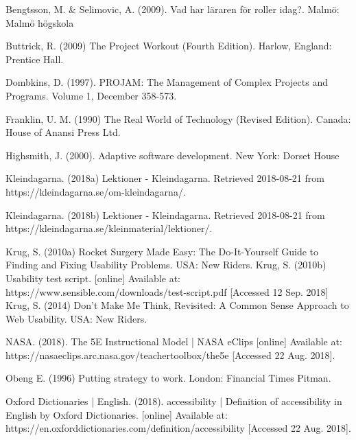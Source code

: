 \makeatletter
\renewcommand\@biblabel[1]{}
\makeatother

\begin{thebibliography}{69}

     Bengtsson, M. \& Selimovic, A. (2009). Vad har läraren för roller idag?. Malmö: Malmö högskola

     Buttrick, R. (2009) The Project Workout (Fourth Edition). Harlow, England: Prentice Hall.
 
     Dombkins, D. (1997). PROJAM: The Management of Complex Projects and Programs. Volume 1, December 358-573.
  
     Franklin, U. M. (1990) The Real World of Technology (Revised Edition). Canada: House of Anansi Press Ltd.
  
     Highsmith, J. (2000). Adaptive software development. New York: Dorset House
  
     Kleindagarna. (2018a) Lektioner - Kleindagarna. Retrieved 2018-08-21 from https://kleindagarna.se/om-kleindagarna/.
  
     Kleindagarna. (2018b) Lektioner - Kleindagarna. Retrieved 2018-08-21 from https://kleindagarna.se/kleinmaterial/lektioner/.
  
     Krug, S. (2010a) Rocket Surgery Made Easy: The Do-It-Yourself Guide to Finding and Fixing Usability Problems. USA: New Riders.
     Krug, S. (2010b) Usability test script. [online] Available at: https://www.sensible.com/downloads/test-script.pdf [Accessed 12 Sep. 2018]
     Krug, S. (2014) Don't Make Me Think, Revisited: A Common Sense Approach to Web Usability. USA: New Riders.
    
     NASA. (2018). The 5E Instructional Model | NASA eClips [online] Available at: https://nasaeclips.arc.nasa.gov/teachertoolbox/the5e [Accessed 22 Aug. 2018].

     Obeng E. (1996) Putting strategy to work. London: Financial Times Pitman.

     Oxford Dictionaries | English. (2018). accessibility | Definition of accessibility in English by Oxford Dictionaries. [online] Available at: https://en.oxforddictionaries.com/definition/accessibility [Accessed 22 Aug. 2018].
  

\end{thebibliography}
